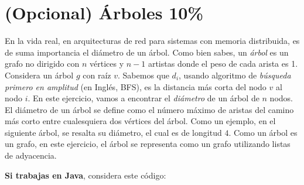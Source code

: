 \documentclass[10 pt]{article}
\begin{document}
\section{(Opcional) Árboles 10\%}
\begin{multicols}{2}
En la vida real, en arquitecturas de red para sistemas con memoria distribuida, es de suma importancia el diámetro de un árbol. 
Como bien sabes, un \emph{árbol} es un grafo no dirigido con $n$ vértices y $n - 1$ artistas donde el peso de cada arista es 1. Considera un árbol $g$ con raíz $v$. Sabemos que $d_i$, usando algoritmo de \emph{búsqueda primero en amplitud} (en Inglés, BFS), es la distancia más corta  del nodo $v$ al nodo $i$. En este ejercicio, vamos a encontrar el \textit{diámetro} de un árbol de $n$ nodos. El diámetro de un árbol se define como el número máximo de aristas del camino más corto entre cualesquiera dos vértices del árbol. Como un ejemplo, en el siguiente árbol, se resalta su diámetro, el cual es de longitud $4$. Como un árbol es un grafo, en este ejercicio, el árbol se representa como un grafo utilizando listas de adyacencia. 
  \\
  \begin{center}
  \end{center}

\end{multicols}


\textbf{Si trabajas en Java}, considera este código:

\hspace{1cm}
\end{document}
